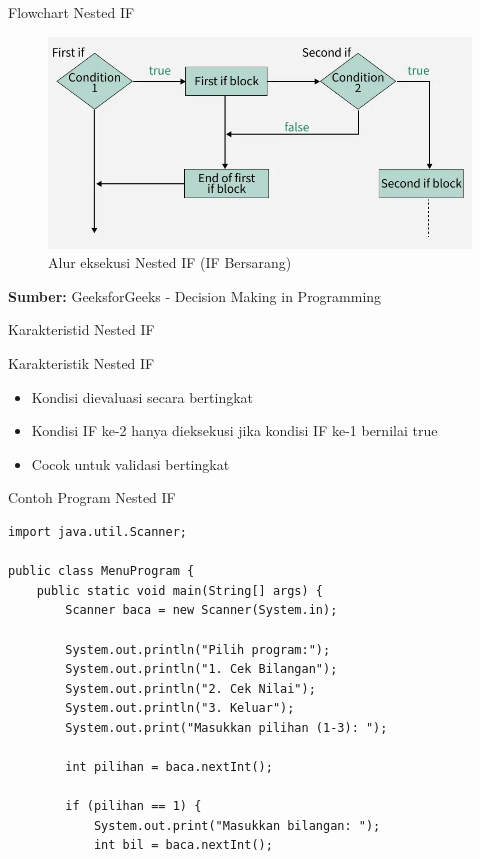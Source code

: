 \documentclass{beamer}
\begin{document}
\begin{frame}{Flowchart Nested IF}
  \begin{figure}
      \centering
      \includegraphics[width=0.75\linewidth]{Struktur Kontrol 1/nested-if-flowchart.png}
      \caption{Alur eksekusi Nested IF (IF Bersarang)}
      \label{fig:placeholder}
  \end{figure}
  \textbf{Sumber: }GeeksforGeeks - Decision Making in Programming
\end{frame}

\begin{frame}{Karakteristid Nested IF}
  \begin{block}{Karakteristik Nested IF}
    \begin{itemize}
      \item Kondisi dievaluasi secara bertingkat
      \item Kondisi IF ke-2 hanya dieksekusi jika kondisi IF ke-1 bernilai true
      \item Cocok untuk validasi bertingkat
    \end{itemize}
  \end{block}
\end{frame}
\begin{frame}[fragile]{Contoh Program Nested IF}
\begin{lstlisting}
import java.util.Scanner;

public class MenuProgram {
    public static void main(String[] args) {
        Scanner baca = new Scanner(System.in);
        
        System.out.println("Pilih program:");
        System.out.println("1. Cek Bilangan");
        System.out.println("2. Cek Nilai");
        System.out.println("3. Keluar");
        System.out.print("Masukkan pilihan (1-3): ");
        
        int pilihan = baca.nextInt();
        
        if (pilihan == 1) {
            System.out.print("Masukkan bilangan: ");
            int bil = baca.nextInt();
\end{lstlisting}
\end{frame}
\end{document}
